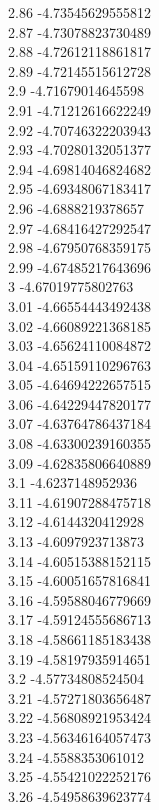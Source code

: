 {2.86	-4.73545629555812\\
2.87	-4.73078823730489\\
2.88	-4.72612118861817\\
2.89	-4.72145515612728\\
2.9	-4.71679014645598\\
2.91	-4.71212616622249\\
2.92	-4.70746322203943\\
2.93	-4.70280132051377\\
2.94	-4.69814046824682\\
2.95	-4.69348067183417\\
2.96	-4.6888219378657\\
2.97	-4.68416427292547\\
2.98	-4.67950768359175\\
2.99	-4.67485217643696\\
3	-4.67019775802763\\
3.01	-4.66554443492438\\
3.02	-4.66089221368185\\
3.03	-4.65624110084872\\
3.04	-4.65159110296763\\
3.05	-4.64694222657515\\
3.06	-4.64229447820177\\
3.07	-4.63764786437184\\
3.08	-4.63300239160355\\
3.09	-4.62835806640889\\
3.1	-4.6237148952936\\
3.11	-4.61907288475718\\
3.12	-4.6144320412928\\
3.13	-4.6097923713873\\
3.14	-4.60515388152115\\
3.15	-4.60051657816841\\
3.16	-4.59588046779669\\
3.17	-4.59124555686713\\
3.18	-4.58661185183438\\
3.19	-4.58197935914651\\
3.2	-4.57734808524504\\
3.21	-4.57271803656487\\
3.22	-4.56808921953424\\
3.23	-4.56346164057473\\
3.24	-4.5588353061012\\
3.25	-4.55421022252176\\
3.26	-4.54958639623774\\
}

